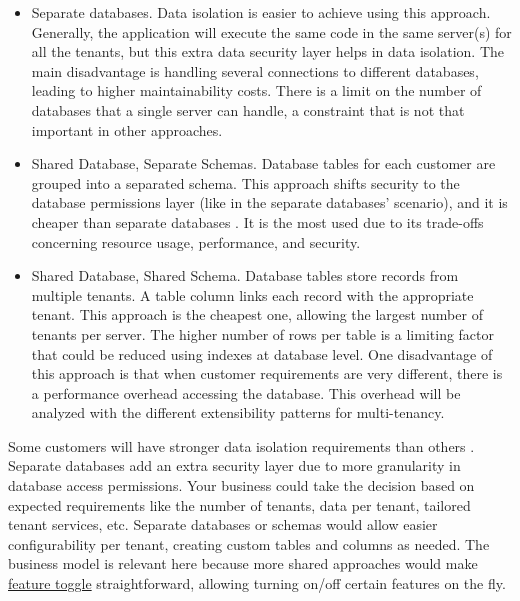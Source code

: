 \documentclass[12pt,english]{article} %
\begin{document}
\begin{itemize}
    \item Separate databases. Data isolation is easier to achieve using this approach. Generally, the application will execute the same code in the same server(s) for all the tenants, but this extra data security layer helps in data isolation. The main disadvantage is handling several connections to different databases, leading to higher maintainability costs. There is a limit on the number of databases that a single server can handle, a constraint that is not that important in other approaches.
    \item Shared Database, Separate Schemas.
    Database tables for each customer are grouped into a separated schema.
    This approach shifts security to the database permissions layer (like in the separate databases' scenario), and it is cheaper than separate databases \cite{cloud-computing-state-of-the-art}.
    It is the most used due to its trade-offs concerning resource usage, performance, and security.
    \item Shared Database, Shared Schema. Database tables store records from multiple tenants.
    A table column links each record with the appropriate tenant.
    This approach is the cheapest one, allowing the largest number of tenants per server.
    The higher number of rows per table is a limiting factor that could be reduced using indexes at database level.
    One disadvantage of this approach is that when customer requirements are very different, there is a performance overhead accessing the database.
    This overhead will be analyzed with the different extensibility patterns for multi-tenancy.
\end{itemize}

Some customers will have stronger data isolation requirements than others \cite{cloud-computing-state-of-the-art}.
Separate databases add an extra security layer due to more granularity in database access permissions.
Your business could take the decision based on expected requirements like the number of tenants, data per tenant, tailored tenant services, etc.
Separate databases or schemas would allow easier configurability per tenant, creating custom tables and columns as needed.
The business model is relevant here because more shared approaches would make \href{https://en.wikipedia.org/wiki/Feature_toggle}{feature toggle} straightforward, allowing turning on/off certain features on the fly.

\
\end{document}
